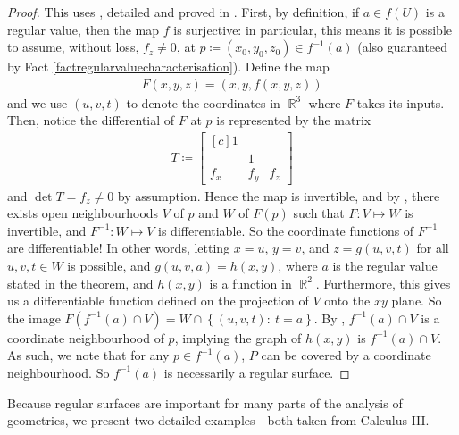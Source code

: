 \documentclass{amsart} %
\theoremstyle{mytheoremstyle}
\theoremstyle{definition}
\numberwithin{equation}{section}
\DeclareMathOperator{\R}{\mathbb{R}}
\DeclareMathOperator{\1}{\mathbbm{1}}
\newcommand{\condset}[4]{\left\{ #1  : \: #2 #3 #4 \right\}}
\begin{document}
\begin{proof}
	This uses , detailed and proved in . First, by definition, if $a \in f(U)$ is a regular value, then the map $f$ is surjective: in particular, this means it is possible to assume, without loss, $f_z \neq 0$, at $p \coloneqq (x_0,y_0,z_0) \in f^{-1} (a)$ (also guaranteed by Fact \ref{factregularvaluecharacterisation}). Define the map
	\begin{align*}
	F(x,y,z) = (x,y,f(x,y,z))
	\end{align*}
	and we use $(u,v,t)$ to denote the coordinates in $\R^3$ where $F$ takes its inputs. Then, notice the differential of $F$ at $p$ is represented by the matrix
	\begin{align*}
		T \coloneqq \begin{bmatrix*}[c]
			1 & & \\ & 1 & \\ f_x & f_y & f_z
		\end{bmatrix*}
	\end{align*}
	and $\det T = f_z \neq 0$ by assumption. Hence the map is invertible, and by , there exists open neighbourhoods $V$ of $p$ and $W$ of $F(p)$ such that $F: V \mapsto W$ is invertible, and $F^{-1} : W \mapsto V$ is differentiable. So the coordinate functions of $F^{-1}$ are differentiable! In other words, letting $x=u$, $y=v$, and $z=g(u,v,t)$ for all $u,v,t \in W$ is possible, and $g(u,v,a) = h(x,y) $, where $a$ is the regular value stated in the theorem, and $h(x,y) $ is a function in $\R^2$. Furthermore, this gives us a differentiable function defined on the projection of $V$ onto the $xy$ plane. So the image $F(f^{-1}(a) \cap V ) = W \cap \condset{(u,v,t)}{t}{=}{a}$. By , $f^{-1}(a) \cap V$ is a coordinate neighbourhood of $p$, implying the graph of $h(x,y)$ is $f^{-1}(a) \cap V$. As such, we note that for any $p \in f^{-1}(a)$, $P$ can be covered by a coordinate neighbourhood. So $f^{-1}(a)$ is necessarily a regular surface.
\end{proof}

Because regular surfaces are important for many parts of the analysis of geometries, we present two detailed examples---both taken from Calculus III.
\end{document}
